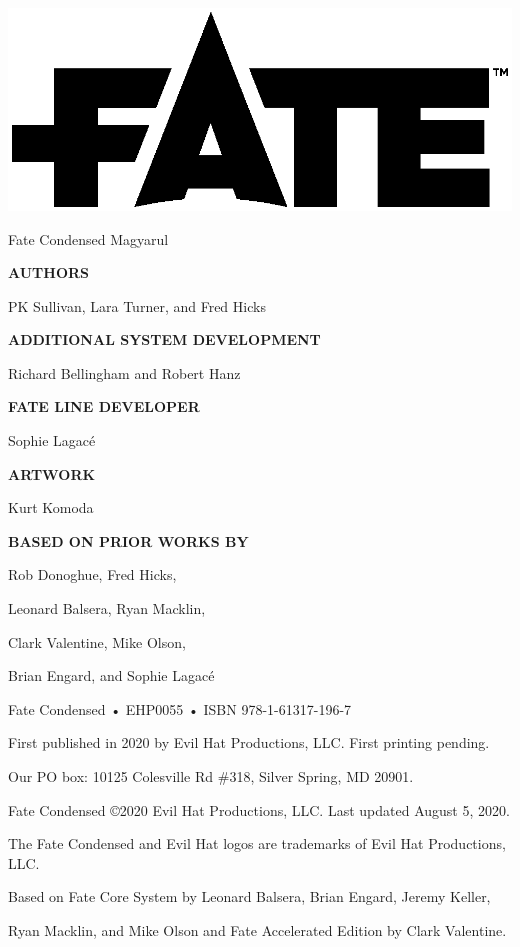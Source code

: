 \begin{center}

\includegraphics[trim= 0cm 4cm 0cm 1cm]{fate logo.eps}

{\RobotoCondensed\Huge\MakeUppercase Fate Condensed Magyarul}

\vspace{2em}

\textbf{AUTHORS}

PK Sullivan, Lara Turner, and Fred Hicks

\textbf{ADDITIONAL SYSTEM DEVELOPMENT}

Richard Bellingham and Robert Hanz

\textbf{FATE LINE DEVELOPER}

Sophie Lagacé

\textbf{ARTWORK}

Kurt Komoda

\textbf{BASED ON PRIOR WORKS BY}

Rob Donoghue, Fred Hicks,

Leonard Balsera, Ryan Macklin,

Clark Valentine, Mike Olson,

Brian Engard, and Sophie Lagacé

\vspace{2em}

Fate Condensed • EHP0055 • ISBN 978-1-61317-196-7

First published in 2020 by Evil Hat Productions, LLC. First printing pending.

Our PO box: 10125 Colesville Rd \#318, Silver Spring, MD 20901.

Fate Condensed ©2020 Evil Hat Productions, LLC. Last updated August 5, 2020.

The Fate Condensed and Evil Hat logos are trademarks of Evil Hat Productions, LLC.

Based on Fate Core System by Leonard Balsera, Brian Engard, Jeremy Keller,

Ryan Macklin, and Mike Olson and Fate Accelerated Edition by Clark Valentine.


\end{center}
